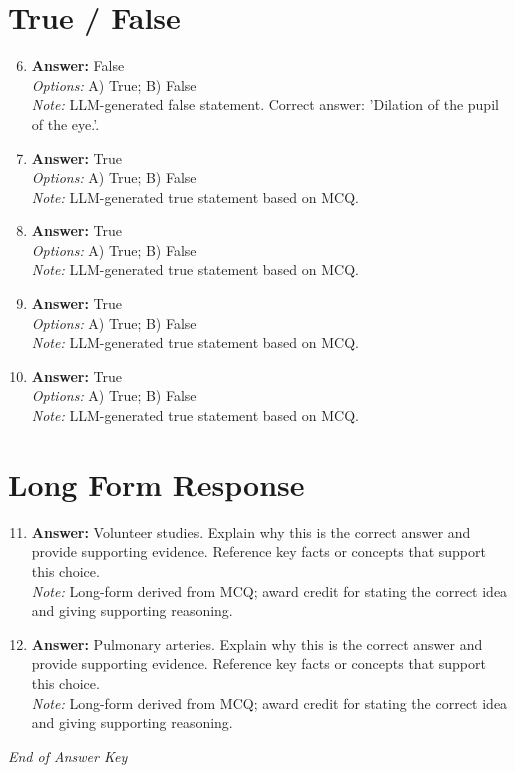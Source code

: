 \documentclass[12pt]{article}
\begin{document}
\section*{True / False}
\begin{enumerate}[label=\arabic*.]
\setcounter{enumi}{5}
\item \textbf{Answer:} False
\\ \textit{Options:} A) True; B) False
\\ \textit{Note:} LLM-generated false statement. Correct answer: 'Dilation of the pupil of the eye.'.
\item \textbf{Answer:} True
\\ \textit{Options:} A) True; B) False
\\ \textit{Note:} LLM-generated true statement based on MCQ.
\item \textbf{Answer:} True
\\ \textit{Options:} A) True; B) False
\\ \textit{Note:} LLM-generated true statement based on MCQ.
\item \textbf{Answer:} True
\\ \textit{Options:} A) True; B) False
\\ \textit{Note:} LLM-generated true statement based on MCQ.
\item \textbf{Answer:} True
\\ \textit{Options:} A) True; B) False
\\ \textit{Note:} LLM-generated true statement based on MCQ.
\end{enumerate}

\section*{Long Form Response}
\begin{enumerate}[label=\arabic*.]
\setcounter{enumi}{10}
\item \textbf{Answer:} Volunteer studies. Explain why this is the correct answer and provide supporting evidence. Reference key facts or concepts that support this choice.
\\ \textit{Note:} Long-form derived from MCQ; award credit for stating the correct idea and giving supporting reasoning.
\item \textbf{Answer:} Pulmonary arteries. Explain why this is the correct answer and provide supporting evidence. Reference key facts or concepts that support this choice.
\\ \textit{Note:} Long-form derived from MCQ; award credit for stating the correct idea and giving supporting reasoning.
\end{enumerate}

\vfill
\noindent\textit{End of Answer Key}
\end{document}

